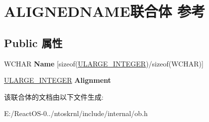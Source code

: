 \hypertarget{union_a_l_i_g_n_e_d_n_a_m_e}{}\section{A\+L\+I\+G\+N\+E\+D\+N\+A\+M\+E联合体 参考}
\label{union_a_l_i_g_n_e_d_n_a_m_e}
\subsection*{Public 属性}
\begin{DoxyCompactItemize}
\item 
\mbox{\label{union_a_l_i_g_n_e_d_n_a_m_e_a5ff8cac4fa3eb4184bdadaf1f4a77fdb}} 
W\+C\+H\+AR {\bfseries Name} \mbox{[}sizeof(\hyperlink{struct___u_l_a_r_g_e___i_n_t_e_g_e_r}{U\+L\+A\+R\+G\+E\+\_\+\+I\+N\+T\+E\+G\+ER})/sizeof(W\+C\+H\+AR)\mbox{]}
\item 
\mbox{\label{union_a_l_i_g_n_e_d_n_a_m_e_a499cf34af683ec7699b9c859e4e2bf7c}} 
\hyperlink{struct___u_l_a_r_g_e___i_n_t_e_g_e_r}{U\+L\+A\+R\+G\+E\+\_\+\+I\+N\+T\+E\+G\+ER} {\bfseries Alignment}
\end{DoxyCompactItemize}


该联合体的文档由以下文件生成\+:\begin{DoxyCompactItemize}
\item 
E\+:/\+React\+O\+S-\/0../ntoskrnl/include/internal/ob.\+h\end{DoxyCompactItemize}
